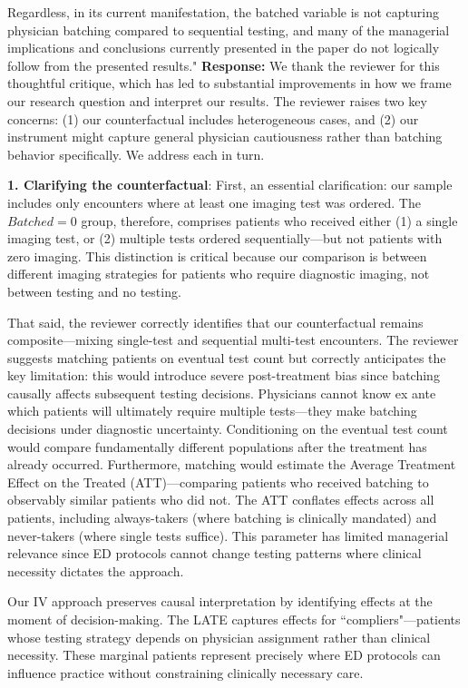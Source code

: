 \documentclass[11pt]{article}
\newenvironment{quote2}
{ \bigskip
\noindent
         \small\em
         \baselineskip=14pt
}
\newcommand{\1}{\hbox{\rm 1\kern-.35em 1}}
\begin{document}
{\begin{quote2}
Regardless, in its current manifestation, the batched variable is not capturing physician batching compared to sequential testing, and many of the managerial implications and conclusions currently presented in the paper do not logically follow from the presented results."
\end{quote2}

\noindent\textbf{Response:} \color{blue}We thank the reviewer for this thoughtful critique, which has led to substantial improvements in how we frame our research question and interpret our results. The reviewer raises two key concerns: (1) our counterfactual includes heterogeneous cases, and (2) our instrument might capture general physician cautiousness rather than batching behavior specifically. We address each in turn.

\textbf{1. Clarifying the counterfactual}: First, an essential clarification: our sample includes only encounters where at least one imaging test was ordered. The $Batched=0$ group, therefore, comprises patients who received either (1) a single imaging test, or (2) multiple tests ordered sequentially—but not patients with zero imaging. This distinction is critical because our comparison is between different imaging strategies for patients who require diagnostic imaging, not between testing and no testing.

That said, the reviewer correctly identifies that our counterfactual remains composite—mixing single-test and sequential multi-test encounters. The reviewer suggests matching patients on eventual test count but correctly anticipates the key limitation: this would introduce severe post-treatment bias since batching causally affects subsequent testing decisions. Physicians cannot know ex ante which patients will ultimately require multiple tests—they make batching decisions under diagnostic uncertainty. Conditioning on the eventual test count would compare fundamentally different populations after the treatment has already occurred. Furthermore, matching would estimate the Average Treatment Effect on the Treated (ATT)---comparing patients who received batching to observably similar patients who did not. The ATT conflates effects across all patients, including always-takers (where batching is clinically mandated) and never-takers (where single tests suffice). This parameter has limited managerial relevance since ED protocols cannot change testing patterns where clinical necessity dictates the approach.

Our IV approach preserves causal interpretation by identifying effects at the moment of decision-making. The LATE captures effects for ``compliers"—patients whose testing strategy depends on physician assignment rather than clinical necessity. These marginal patients represent precisely where ED protocols can influence practice without constraining clinically necessary care.

}
\end{document}

